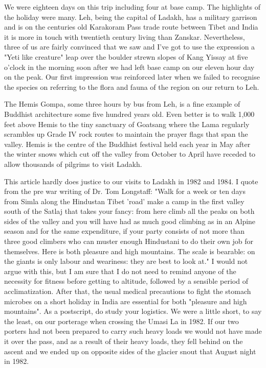 \documentclass[a5paper,openany,font 10pt]{scrbook}
\begin{document}
We were eighteen days on this trip including four at base
camp. The highlights of the holiday were many. Leh, being the
capital of Ladakh, has a military garrison and is on the
centuries old Karakoram Pass trade route between Tibet and India
it is more in touch with twentieth century living than Zanskar.
Nevertheless, three of us are fairly convinced that we saw   and
I've got to use the expression   a  "Yeti like creature" leap over
the boulder strewn slopes of Kang Yissay at five o'clock in the
morning soon after we had left base camp on our eleven hour day
on the peak. Our first impression was reinforced later when we
failed to recognise the species on referring to the flora and
fauna of the region on our return to Leh.

The Hemis Gompa, some three hours by bus from Leh, is a fine
example of Buddhist architecture some five hundred years old.
Even better is to walk 1,000 feet above Hemis to the tiny
sanctuary of Goatsang where the Lama regularly scrambles up Grade
IV rock routes to maintain the prayer flags that span the valley.
Hemis is the centre of the Buddhist festival held each year in
May after the winter snows which cut off the valley from October
to April have receded to allow thousands of pilgrims to visit
Ladakh.

This article hardly does justice to our visits to Ladakh in
1982 and 1984. I quote from the pre war writing of Dr. Tom
Longstaff:
"Walk for a week or ten days from Simla along the Hindustan Tibet 'road'
make a camp in the first valley south of the
Satlaj that takes your fancy: from here climb all the peaks on
both sides of the valley and you will have had as much good
climbing as in an Alpine season and for the same expenditure, if
your party consists of not more than three good climbers who can
muster enough Hindustani to do their own job for themselves. Here
is both pleasure and high mountains. The scale is bearable: on
the giants is only labour and weariness: they are best to look
at."    I would not argue with this, but I am sure that I do not
need to remind anyone of the necessity for fitness before
getting to altitude, followed by a sensible period of
acclimatization. After that, the usual medical precautions to
fight the stomach microbes on a short holiday in India are
essential for both "pleasure and high mountains".
As a postscript, do study your logistics. We were a little
short, to say the least, on our porterage when crossing the Umasi
La in 1982. If our two porters had not been prepared to carry
such heavy loads we would not have made it over the pass, and as
a result of their heavy loads, they fell behind on the ascent and
we ended up on opposite sides of the glacier snout that August
night in 1982.
\end{document}
